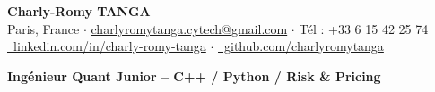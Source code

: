 \begin{center}
    {\Large \textbf{Charly-Romy TANGA}}\\[3pt]
    {\small Paris, France \quad$\cdot$\quad
    \href{mailto:charlyromytanga.cytech@gmail.com}{charlyromytanga.cytech@gmail.com} \quad$\cdot$\quad
    Tél : +33 6 15 42 25 74}\\[3pt]
    \href{https://linkedin.com/in/charly-romy-tanga}{\faLinkedinIn\ linkedin.com/in/charly-romy-tanga} \quad$\cdot$\quad
    \href{https://github.com/charlyromytanga}{\faGithub\ github.com/charlyromytanga}
\end{center}

\vspace{0.08cm}
\begin{center}
    \textbf{Ingénieur Quant Junior -- C++ / Python / Risk \& Pricing}
\end{center}

\vspace{0.15cm}